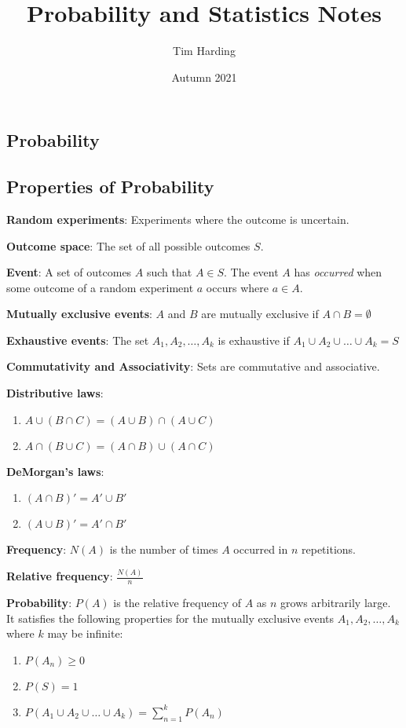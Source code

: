 \documentclass{article}
\title{Probability and Statistics Notes}
\author{Tim Harding}
\date{Autumn 2021}
\begin{document}
\begin{multicols*}{2}

\section{Probability}

\subsection{Properties of Probability}

\textbf{Random experiments}: Experiments where the outcome is uncertain.

\textbf{Outcome space}: The set of all possible outcomes $S$.

\textbf{Event}: A set of outcomes $A$ such that $A \in S$. The event $A$ has \textit{occurred} when some outcome of a random experiment $a$ occurs where $a \in A$.

\textbf{Mutually exclusive events}: $A$ and $B$ are mutually exclusive if $A \cap B = \emptyset$

\textbf{Exhaustive events}: The set $A_1, A_2, \ldots, A_k$ is exhaustive if $A_1 \cup A_2 \cup \ldots \cup A_k = S$

\textbf{Commutativity and Associativity}: Sets are commutative and associative.

\textbf{Distributive laws}:
\begin{enumerate}
    \item $A \cup (B \cap C) = (A \cup B) \cap (A \cup C)$
    \item $A \cap (B \cup C) = (A \cap B) \cup (A \cap C)$
\end{enumerate}

\textbf{DeMorgan's laws}:
\begin{enumerate}
    \item $(A \cap B)' = A' \cup B'$
    \item $(A \cup B)' = A' \cap B'$
\end{enumerate}

\textbf{Frequency}: $N(A)$ is the number of times $A$ occurred in $n$ repetitions.

\textbf{Relative frequency}: $\frac{N(A)}{n}$

\textbf{Probability}: $P(A)$ is the relative frequency of $A$ as $n$ grows arbitrarily large. It satisfies the following properties for the mutually exclusive events $A_1, A_2, \ldots, A_k$ where $k$ may be infinite:
\begin{enumerate}
    \item $P(A_n) \geq 0$
    \item $P(S) = 1$
    \item $P(A_1 \cup A_2 \cup \ldots \cup A_k) = \sum_{n=1}^k{P(A_n)}$
\end{enumerate}


\end{multicols*}
\end{document}

